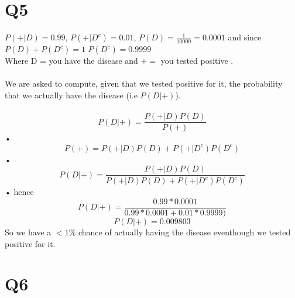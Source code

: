 \documentclass[a4paper,11pt]{article}
\begin{document}
\section*{Q5}
$P(+|D)=0.99$, $P(+|D^{c})=0.01$, $P(D)=\frac{1}{10000}=0.0001$ and since $P(D)+ P(D^c) = 1$ $P(D^c) = 0.9999$\\ 
Where D = you have the disease and $+ = $ you tested positive .\\\\
We are asked to compute, given that we tested positive for it, the probability that we actually have the disease (i.e $P(D|+)$).\\\\
\begin{equation}
P(D|+) =\frac{P(+|D)P(D)}{P(+)}
\end{equation}• 
\begin{equation}
P(+) = P(+|D)P(D) +P(+|D^c)P(D^c)
\end{equation}• 
\begin{equation}
P(D|+) =\frac{P(+|D)P(D)}{ P(+|D)P(D) +P(+|D^c)P(D^c)}
\end{equation}• 
hence 
$$P(D|+) = \frac{0.99*0.0001}{0.99*0.0001  + 0.01*0.9999)}$$
$$P(D|+) = 0.009803$$
So we have a $<1\%$  chance of actually having the disease eventhough we tested positive for it.
\newpage

\section*{Q6}
\end{document}
